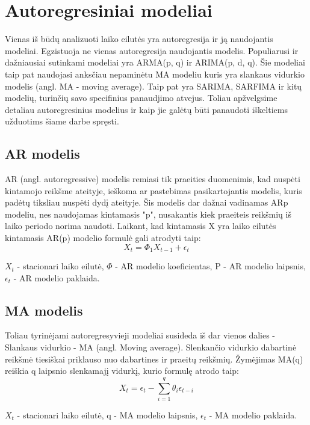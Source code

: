 \documentclass{VUMIFInfKursinis}
\begin{document}
\section{Autoregresiniai modeliai}
Vienas iš būdų analizuoti laiko eilutės yra autoregresija ir ją naudojantis modeliai. Egzistuoja ne vienas autoregresija naudojantis modelis. 
Populiarusi ir dažniausiai sutinkami modeliai yra ARMA(p, q) ir ARIMA(p, d, q).
Šie modeliai taip pat naudojasi anksčiau nepaminėtu MA modeliu kuris yra slankaus vidurkio modelis (angl. MA - moving average).
Taip pat yra SARIMA, SARFIMA ir kitų modelių, turinčių savo specifinius panaudjimo atvejus. 
Toliau apžvelgsime detaliau autoregresinius modelius ir kaip jie galėtų būti panaudoti iškeltiems užduotims šiame darbe spręsti.

\subsection{AR modelis}
AR (angl. autoregressive) modelis remiasi tik praeities duomenimis, kad nuspėti kintamojo reikšme ateityje, ieškoma ar pastebimas pasikartojantis
modelis, kuris padėtų tiksliau nuspėti dydį ateityje. Šis modelis dar dažnai vadinamas ARp modeliu, nes naudojamas kintamasis "p", nusakantis kiek praeiteis reikšmių 
iš laiko periodo norima naudoti. Laikant, kad kintamasis X yra laiko eilutės kintamasis AR(p) modelio formulė gali atrodyti taip: 
\[X_{t} = \Phi _{1}X_{t-1}+\epsilon_{t} \]

${X_t}$ - stacionari laiko eilutė, $\Phi$ - AR modelio koeficientas, P - AR modelio laipsnis, $ \epsilon_{t} $ - AR modelio paklaida.

\subsection {MA modelis}
Toliau tyrinėjami autoregresyvieji modeliai susideda iš dar vienos dalies - Slankaus vidurkio - MA (angl. Moving average). Slenkančio vidurkio dabartinė
reikšmė tiesiškai priklauso nuo dabartines ir praeitų reikšmių. Žymėjimas MA(q) reiškia q laipsnio slenkamajį vidurkį, kurio formulę atrodo taip:  
\[X_{t} = \epsilon_{t} - \sum_{i=1}^{q}\theta_{i}  \epsilon_{t-i}\]

${X_t}$ - stacionari laiko eilutė, q - MA modelio laipsnis, ${\epsilon_t}$ - MA modelio paklaida.
\end{document}
